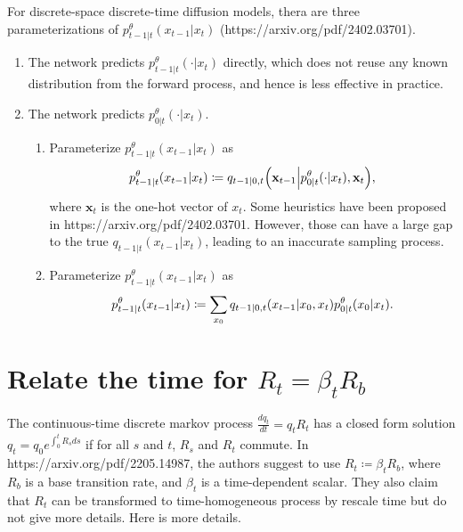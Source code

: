 \documentclass[10pt]{article}
\begin{document}
For discrete-space discrete-time diffusion models, thera are three parameterizations of $p^\theta_{t-1|t}(x_{t-1}|x_t)$ (https://arxiv.org/pdf/2402.03701).
\begin{enumerate}
  \item The network predicts $p^\theta_{t-1|t}(\cdot|x_t)$ directly, which does not reuse any known distribution from the forward process, and hence is less effective in practice.
  \item The network predicts $p^\theta_{0|t}(\cdot|x_t)$.
  \begin{enumerate}
    \item Parameterize $p^\theta_{t-1|t}(x_{t-1}|x_t)$ as
    \begin{eqnarray*}
      p^\theta_{t-1|t}(x_{t-1}|x_t)\coloneq q_{t-1|0,t}\qty(\mathbf{x}_{t-1}\middle|p^\theta_{0|t}(\cdot|x_t),\mathbf{x}_t),
    \end{eqnarray*}
    where $\mathbf{x}_t$ is the one-hot vector of $x_t$. Some heuristics have been proposed in https://arxiv.org/pdf/2402.03701. However, those can have a large gap to the true $q_{t-1|t}(x_{t−1}|x_t)$, leading to an inaccurate sampling process.
    \item Parameterize $p^\theta_{t-1|t}(x_{t-1}|x_t)$ as
    \begin{eqnarray*}
      p^\theta_{t-1|t}(x_{t-1}|x_t)\coloneq \sum_{x_0}q_{t-1|0,t}\qty(x_{t-1}|x_0,x_t)p^\theta_{0|t}(x_0|x_t).
    \end{eqnarray*}
  \end{enumerate}
\end{enumerate}

\section{Relate the time for $R_t=\beta_t R_b$}

The continuous-time discrete markov process $\frac{d q_t}{dt}=q_t R_t$ has a closed form solution $q_t = q_0 e^{\int_0^t R_s ds}$ if for all $s$ and $t$, $R_s$ and $R_t$ commute. In https://arxiv.org/pdf/2205.14987, the authors suggest to use $R_t\coloneqq \beta_t R_b$, where $R_b$ is a base transition rate, and $\beta_t$ is a time-dependent scalar. They also claim that $R_t$ can be transformed to time-homogeneous process by rescale time but do not give more details. Here is more details.
\end{document}
